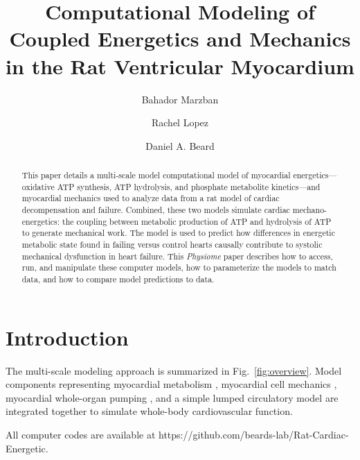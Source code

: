\documentclass[fleqn,10pt]{physiome}
\title{Computational Modeling of Coupled Energetics and Mechanics in the Rat Ventricular Myocardium}
\author[1]{Bahador Marzban}
\author[1]{Rachel Lopez}
\author[1][beardda@umich.edu]{Daniel A. Beard}
\affil[1]{Molecular and Integrative Physiology, University of Michigan, Ann Arbor, Michigan, USA}
\begin{document}
\maketitle

\begin{abstract}
This paper details a multi-scale model computational model of myocardial energetics---oxidative ATP synthesis, ATP hydrolysis, and phosphate metabolite kinetics---and myocardial mechanics used to analyze data from a rat model of cardiac decompensation and failure. Combined, these two models simulate cardiac mechano-energetics: the coupling between metabolic production of ATP and hydrolysis of ATP to generate mechanical work. The model is used to predict how differences in energetic metabolic state  found in failing versus control hearts causally contribute to systolic mechanical dysfunction in heart failure. This {\em Physiome} paper describes how to access, run, and manipulate these computer models, how to parameterize the models to match data, and how to compare model predictions to data.
\end{abstract}



\section{Introduction}

The multi-scale modeling approach is summarized in Fig.~\ref{fig:overview}. Model components representing myocardial metabolism \cite{Bazil2016}, myocardial cell mechanics \cite{Tewari2016a,Tewari2016b}, myocardial whole-organ pumping \cite{Lumens2009}, and a simple lumped circulatory model are integrated together to simulate whole-body cardiovascular function. 

All computer codes are available at https://github.com/beards-lab/Rat-Cardiac-Energetic. 
 
\end{document}
